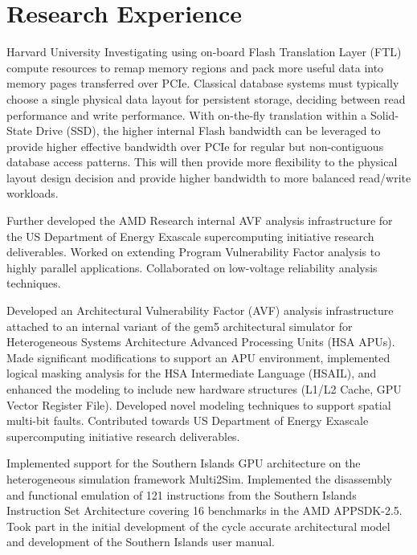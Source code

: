 \section{Research Experience}

 {Harvard University}{}
  { Investigating using on-board Flash Translation Layer (FTL) compute resources to remap memory regions and pack more useful data into memory pages transferred over PCIe. Classical database systems must typically choose a single physical data layout for persistent storage, deciding between read performance and write performance. With on-the-fly translation within a Solid-State Drive (SSD), the higher internal Flash bandwidth can be leveraged to provide higher effective bandwidth over PCIe for regular but non-contiguous database access patterns. This will then provide more flexibility to the physical layout design decision and provide higher bandwidth to more balanced read/write workloads. \\
  }

  { Further developed the AMD Research internal AVF analysis infrastructure for the US Department of Energy Exascale supercomputing initiative research deliverables. Worked on extending Program Vulnerability Factor analysis to highly parallel applications. Collaborated on low-voltage reliability analysis techniques. \\
  }

  { Developed an Architectural Vulnerability Factor (AVF) analysis infrastructure attached to an internal variant of the gem5 architectural simulator for Heterogeneous Systems Architecture Advanced Processing Units (HSA APUs). Made significant modifications to support an APU environment, implemented logical masking analysis for the HSA Intermediate Language (HSAIL), and enhanced the modeling to include new hardware structures (L1/L2 Cache, GPU Vector Register File). Developed novel modeling techniques to support spatial multi-bit faults. Contributed towards US Department of Energy Exascale supercomputing initiative research deliverables. \\
  }

  { Implemented support for the Southern Islands GPU architecture on the heterogeneous simulation framework Multi2Sim. Implemented the disassembly and functional emulation of 121 instructions from the Southern Islands Instruction Set Architecture covering 16 benchmarks in the AMD APPSDK-2.5. Took part in the initial development of the cycle accurate architectural model and development of the Southern Islands user manual. \\
  }
